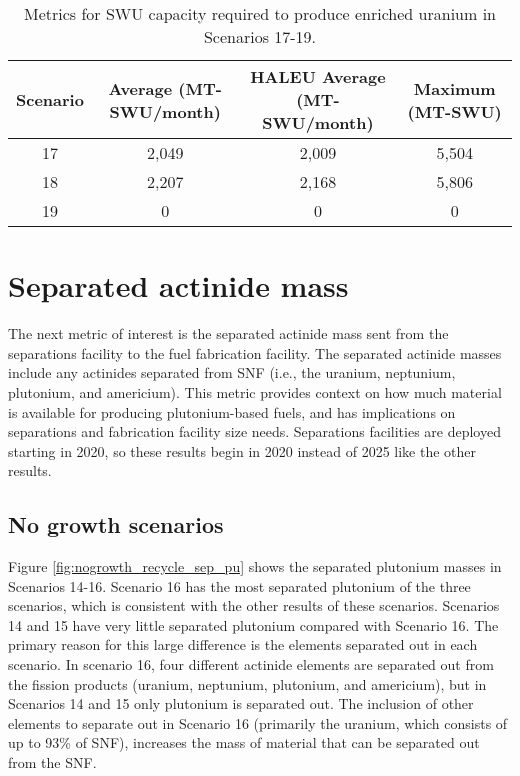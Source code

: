 \begin{table}[h!]
    \centering 
    \caption{Metrics for \gls{SWU} capacity required to produce 
    enriched uranium in Scenarios 17-19.}
    \label{tab:s17-19_swu}
    \begin{tabular}{c c c c}
        \hline 
        Scenario & Average (MT-SWU/month) & HALEU Average (MT-SWU/month)
         & Maximum (MT-SWU) \\
        \hline 
        17 & 2,049 & 2,009 & 5,504 \\
        18 & 2,207 & 2,168 & 5,806 \\
        19 & 0 & 0 & 0 \\
        \hline
        
    \end{tabular}
\end{table}

\section{Separated actinide mass}
The next metric of interest is the separated actinide mass sent 
from the separations facility to the fuel fabrication facility. 
The separated actinide masses include any actinides separated 
from \gls{SNF} (i.e., the uranium, neptunium, plutonium, and 
americium). 
This metric provides context on how much material is available for 
producing plutonium-based fuels, and has implications on 
separations and fabrication facility size needs. Separations facilities 
are deployed starting in 2020, so these results begin in 2020 instead 
of 2025 like the other results. 

\subsection{No growth scenarios}
Figure \ref{fig:nogrowth_recycle_sep_pu} shows the separated plutonium 
masses in Scenarios 14-16. Scenario 16 has the most separated 
plutonium of the three scenarios, which is consistent with the other 
results of these scenarios. Scenarios 14 and 15 have very little 
separated plutonium compared with Scenario 16. The primary reason 
for this large difference is the elements separated out in 
each scenario. In scenario 16, four different actinide elements 
are separated out from the fission products (uranium, neptunium,
plutonium, and americium), but in Scenarios 14 and 15 only plutonium 
is separated out. The inclusion of other elements to separate out 
in Scenario 16 (primarily the uranium, which consists of up to 
93\% of \gls{SNF}), increases the mass of material that can be 
separated out from the \gls{SNF}. 

